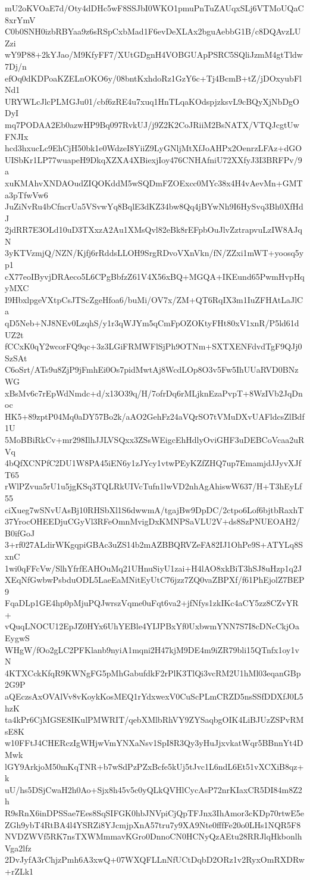 mU2oKVOaE7d/Oty4dDHc5wF8SSJbI0WKO1pmuPnTuZAUqxSLj6VTMoUQaC8xrYmV
C0b0SNH0izbRBYaa9z6sRSpCxbMad1F6evDeXLAx2bguAebbG1B/c8DQAvzLUZzi
wY9P88+2kYJao/M9KfyFF7/XUtGDgnH4VOBGUApPSRC5SQliJzmM4gtTldw7Dj/n
efOq0dKDPoaKZELnOKO6y/08bntKxhdoRz1GzY6c+Tj4BcmB+tZ/jDOxyubFlNd1
URYWLcJlcPLMGJu01/cbf6zRE4u7xuq1HnTLqaKOdspjzksvL9cBQyXjNbDgODyI
mq7PODAA2Eb0azwHP9Bq097RvkUJ/j9Z2K2CoJRiiM2BsNATX/VTQJcgtUwFNJIx
hcd3hxucLc9EhCjH50bk1e0WdzeI8YiiZ9LyGNljMtXfJoAHPx2OenrzLFAz+dGO
UISbKr1LP77wuapeH9DkqXZXA4XBiexjIoy476CNHAfniU72XXfyJ3I3BRFPv/9a
xuKMAhvXNDAOudZIQOKddM5wSQDmFZOExcc0MYc38x4H4vAevMn+GMTa3pTfwVw6
JuZiNvRu4bCfncrUa5VSvwYq8BqlE3dKZ34bw8Qq4jBYwNh9I6HySvq3Bh0XfHdJ
2jdRR7E3OLd10uD3TXxzA2Au1XMsQvl82eBk8rEFpbOuJlvZztrapvuLzIW8AJqN
3yKTVzmjQ/NZN/Kjfj6rRddsLLOH9SrgRDvoVXnVkn/fN/ZZxi1mWT+yoosq5yp1
cX77eoIByvjDRAeco5L6CPgBbfzZ61V4X56xBQ+MGQA+IKEund65PwmHvpHqyMXC
I9HbxlpgeVXtpCsJTScZgeHfoa6/buMi/OV7x/ZM+QT6RqIX3m1IuZFHAtLaJlCa
qD5Neb+NJ8NEv0LzqhS/y1r3qWJYm5qCmFpOZOKtyFHt80xV1xnR/P5ld61dUZ2t
fCCxK0qY2wcorFQ9qc+3z3LGiFRMWFlSjPh9OTNm+SXTXENFdvdTgF9QJj0SzSAt
C6oSrt/ATs9u8ZjP9jFmhEi0Os7pidMwtAj8WcdLOp8O3v5Fw5IhUUaRVD0BNzWG
xBsMv6c7rEpWdNmdc+d/x13O39q/H/7ofrDq6rMLjknEzaPvpT+8WzIVb2JqDnoc
HK5+89zptP04Mq0aDY57Bo2k/aAO2GehFz24aVQrSO7tVMuDXvUAFldcsZlBdf1U
5MoBBiRkCv+mr298IlhJJLVSQxx3ZSsWEigcEhHdlyOviGHF3uDEBCoVcaa2uRVq
4bQfXCNPfC2DU1W8PA45iEN6y1zJYcy1vtwPEyKZfZHQ7up7EmamjdJJyvXJfT65
rWlPZvua5rU1u5jgKSq3TQLRkUIVcTufn1lwVD2nhAgAhiswW637/H+T3hEyLf55
ciXueg7wSNvUAsBj10RHSbXl1S6dwwmA/tgajBw9DpDC/2ctpo6Lof6bjtbRaxhT
37YrocOHEEDjuCGyVl3RFeOmnMvigDxKMNPSaVLU2V+ds8SzPNUEOAH2/B0ifGoJ
3+rf027ALdirWKgqpiGBAc3uZS14b2mAZBBQRVZeFA82IJ1OhPe9S+ATYLq8SxnC
1wi0qFFcVw/SlhYfrfEAHOuMq21UHnuSiyU1zai+H4lAO8xkBiT3hSJ8uHzp1q2J
XEqNfGwbwPsbduODL5LaeEaMNitEyUtC76jzz7ZQ0vaZBPXf/f61PhEjolZ7BEP9
FqaDLp1GE4hp0pMjuPQJwrszVqme0uFqt6va2+jfNfys1zkIKc4aCY5zz8CZvYR+
vQuqLNOCU12EpJZ0HYx6UhYEBle4YIJPBxYf0UxbwmYNN7S7I8cDNcCkjOaEygwS
WHgW/fOo2gLC2PFKlanb9nyiA1mqni2H47kjM9DE4m9iZR79bli15QTnfx1oy1vN
4KTXCckKfqR9KWNgFG5pMhGabufdkF2rPlK3TlQi3vcRM2U1hMl03eqanGBp2G9P
aQEczsAxOVAlVv8vKoykKosMEQ1rYdxwexV0CuScPLmCRZD5nsSSfDDXfJ0L5hzK
ta4kPr6CjMGSE8IKulPMWRIT/qebXMlbRhVY9ZYSaqbgOIK4LiBJUzZSPvRMsE8K
w10FFtJ4CHERczIgWHjwVmYNXaNsv1SpI8R3Qy3yHuJjxvkatWqr5BBnnYt4DMwk
lGY9ArkjoM50mKqTNR+b7wSdPzPZxBcfe5kUj5tJvc1L6ndL6Et51vXCXiB8qz+k
uU/hs5DSjCwaH2h0Ao+Sjx8h45v5c0yQLkQVHlCycAsP72nrKIaxCR5DI84m8Z2h
R9sRnX6inDPSSae7Ees8SqSIFGK0hbJNVpiCjQpTFJnx3IhAmor3cKDp70rtwE5e
ZGh9ybT4RtBA4l4YSRZi8YJcmjpXnA57tru7y9XA9Nte0fffFe20o0LHs1NQR5F8
NVDZWVf5RK7nsTXWMmmavKGro0DnnoCN0HCNyQzAEtu28RRJlqHkbonlhVga2lfz
2DvJyfA3rChjzPmh6A3xwQ+07WXQFLLnNfUCtDqbD2ORz1v2RyxOmRXDRw+rZLk1
